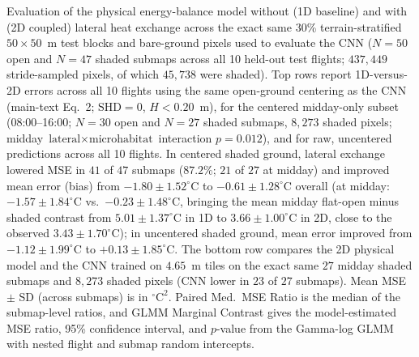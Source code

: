 \documentclass[12pt]{article}
\begin{document}
\begin{table}[h]
{}
\caption{Evaluation of the physical energy-balance model without (1D baseline) and with (2D coupled) lateral heat exchange across the exact same 30\% terrain-stratified $50\times50$~m test blocks and bare-ground pixels used to evaluate the CNN ($N = 50$ open and $N = 47$ shaded submaps across all 10 held-out test flights; $437{,}449$ stride-sampled pixels, of which $45{,}738$ were shaded). Top rows report 1D-versus-2D errors across all 10 flights using the same open-ground centering as the CNN (main-text Eq.~2; $\text{SHD}=0$, $H < 0.20$~m), for the centered midday-only subset (08:00--16:00; $N = 30$ open and $N = 27$ shaded submaps, $8{,}273$ shaded pixels; midday $\text{lateral}\times\text{microhabitat}$ interaction $p = 0.012$), and for raw, uncentered predictions across all 10 flights. In centered shaded ground, lateral exchange lowered MSE in $41$ of $47$ submaps ($87.2\%$; $21$ of $27$ at midday) and improved mean error (bias) from $-1.80 \pm 1.52^\circ\text{C}$ to $-0.61 \pm 1.28^\circ\text{C}$ overall (at midday: $-1.57 \pm 1.84^\circ\text{C}$ vs.\ $-0.23 \pm 1.48^\circ\text{C}$, bringing the mean midday flat-open minus shaded contrast from $5.01 \pm 1.37^\circ\text{C}$ in 1D to $3.66 \pm 1.00^\circ\text{C}$ in 2D, close to the observed $3.43 \pm 1.70^\circ\text{C}$); in uncentered shaded ground, mean error improved from $-1.12 \pm 1.99^\circ\text{C}$ to $+0.13 \pm 1.85^\circ\text{C}$. The bottom row compares the 2D physical model and the CNN trained on $4.65$~m tiles on the exact same $27$ midday shaded submaps and $8{,}273$ shaded pixels (CNN lower in $23$ of $27$ submaps). Mean MSE $\pm$ SD (across submaps) is in $^{\circ}\text{C}^2$. Paired Med.\ MSE Ratio is the median of the submap-level ratios, and GLMM Marginal Contrast gives the model-estimated MSE ratio, 95\% confidence interval, and $p$-value from the Gamma-log GLMM with nested flight and submap random intercepts.}
\label{tab:comparison_summary}
\end{table}

\clearpage


\end{document}
